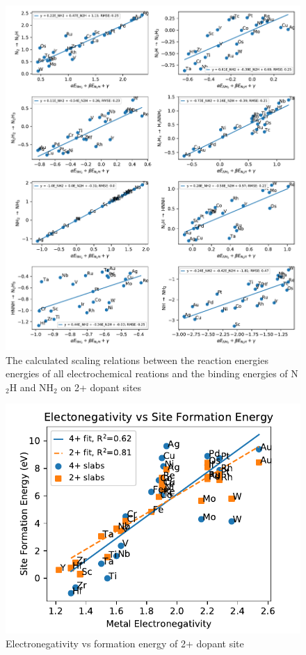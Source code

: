 \documentclass{article}
\begin{document}
\begin{figure}
\centering
\includegraphics[width=1\linewidth]{Images/scaling_reactions.pdf}
\caption{The calculated scaling relations between the reaction energies energies of all electrochemical reations and the binding energies of N$_2$H and NH$_2$ on 2+ dopant sites}
\label{fig:scaling_reactions}
\end{figure}

\begin{figure}
\centering
\includegraphics[width=1\linewidth]{Images/electronegativity_vs_formation.pdf}
\caption{Electronegativity vs formation energy of 2+ dopant site}
\label{fig:electronegativity}
\end{figure}
\end{document}
